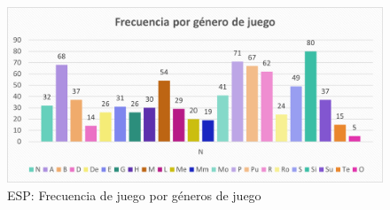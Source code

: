 \documentclass[12pt, a4paper,twoside,titlepage]{book}
\begin{document}
\begin{figure}
    \centering
    \includegraphics[width=1\linewidth]{ANEXO ESP/4AnexESPFrecgne}
    \caption{ESP: Frecuencia de juego por géneros de juego}
    \label{fig:ESPFrecgen}
\end{figure}
\end{document}
